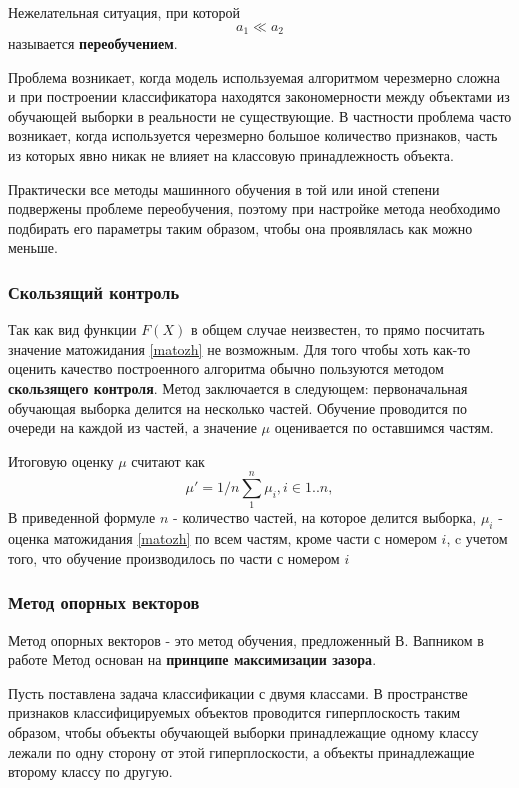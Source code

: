 Нежелательная ситуация, при которой 
\begin{equation}
	a_1 \ll a_2
\end{equation} называется \textbf{переобучением}. 

Проблема возникает, когда модель используемая алгоритмом черезмерно сложна и при построении классификатора находятся закономерности между объектами из обучающей выборки в реальности не существующие. В частности проблема часто возникает, когда используется черезмерно большое количество признаков, часть из которых явно никак не влияет на классовую принадлежность объекта.

Практически все методы машинного обучения в той или иной степени подвержены проблеме переобучения, поэтому при настройке метода необходимо подбирать его параметры таким образом, чтобы она проявлялась как можно меньше.
\subsubsection{Скользящий контроль}
Так как вид функции $F(X)$ в общем случае  неизвестен, то прямо посчитать значение матожидания \ref{matozh} не возможным. Для того чтобы хоть как-то оценить качество построенного алгоритма обычно пользуются методом \textbf{скользящего контроля}. Метод заключается в следующем: первоначальная обучающая выборка делится на несколько частей. Обучение проводится по очереди на каждой из частей, а значение $\mu$ оценивается по оставшимся частям.

Итоговую оценку $\mu$ считают как
\begin{equation}
\mu' = 1/n\sum_1^n{\mu_i}, i \in 1..n, 
\end{equation}
В приведенной формуле $n$ - количество частей, на которое делится выборка, $\mu_i$ - оценка матожидания \ref{matozh} по всем частям, кроме части с номером $i$, c учетом того, что обучение производилось по части с номером $i$


\subsubsection{Метод опорных векторов}
Метод опорных векторов - это метод обучения, предложенный В. Вапником в работе \cite{SVN}
Метод основан на \textbf{принципе максимизации зазора}. 

Пусть поставлена задача классификации с двумя классами. В пространстве признаков классифицируемых объектов проводится гиперплоскость таким образом, чтобы объекты обучающей выборки принадлежащие одному классу лежали по одну сторону от этой гиперплоскости, а объекты принадлежащие второму классу по другую.

